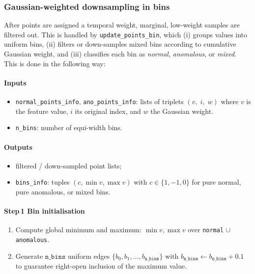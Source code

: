 \documentclass[11pt]{article}
\begin{document}
\subsubsection{Gaussian-weighted downsampling in bins}
\label{sec:gaussian-downsampling}

After points are assigned a temporal weight, marginal, low-weight samples are filtered out.  
This is handled by \texttt{update\_points\_bin}, which (i) groups values into uniform bins, (ii) filters or
down-samples mixed bins according to cumulative Gaussian weight, and (iii) classifies each bin as \emph{normal}, \emph{anomalous}, or \emph{mixed}.  
This is done in the following way:

\paragraph{Inputs}
\begin{itemize}
  \item \texttt{normal\_points\_info}, \texttt{ano\_points\_info}: lists of triplets
        $(v,\;i,\;w)$ where $v$ is the feature value, $i$ its original index, and
        $w$ the Gaussian weight.
  \item \texttt{n\_bins}: number of equi-width bins.
\end{itemize}
\paragraph{Outputs}
\begin{itemize}
  \item filtered / down-sampled point lists;
  \item \texttt{bins\_info}: tuples $(c,\min v,\max v)$ with
        $c\!\in\!\{1,-1,0\}$ for pure normal, pure anomalous, or mixed bins.
\end{itemize}

\paragraph{Step\,1 Bin initialisation}
\begin{enumerate}[label=\arabic*.]
  \item Compute global minimum and maximum:
        $\min v,\max v$ over \texttt{normal} $\cup$ \texttt{anomalous}.
  \item Generate $\texttt{n\_bins}$ uniform edges
        $\{b_0,b_1,\dots,b_{\texttt{n\_bins}}\}$
        with $b_{\texttt{n\_bins}} \leftarrow b_{\texttt{n\_bins}}+0.1$
        to guarantee right-open inclusion of the maximum value.
\end{enumerate}
\end{document}
